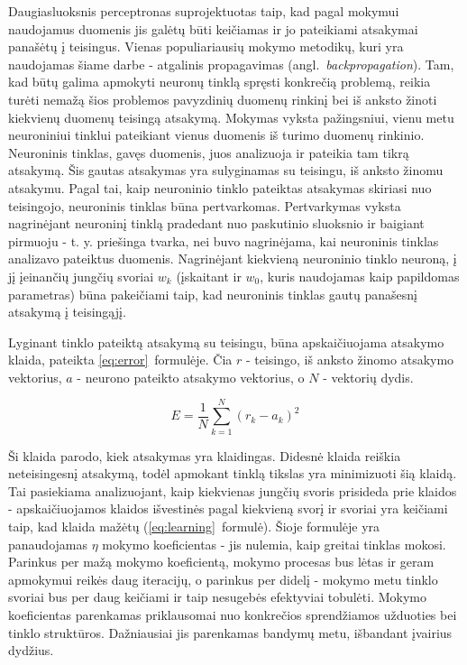 \documentclass{VUMIFPSbakalaurinis}
\begin{document}
Daugiasluoksnis perceptronas suprojektuotas taip, kad pagal mokymui naudojamus duomenis jis galėtų būti keičiamas ir jo pateikiami atsakymai panašėtų į teisingus.
Vienas populiariausių mokymo metodikų, kuri yra naudojamas šiame darbe - atgalinis propagavimas (angl.~\textit{backpropagation}).
Tam, kad būtų galima apmokyti neuronų tinklą spręsti konkrečią problemą, reikia turėti nemažą šios problemos pavyzdinių duomenų rinkinį bei iš anksto žinoti kiekvienų duomenų teisingą atsakymą.
Mokymas vyksta pažingsniui, vienu metu neuroniniui tinklui pateikiant vienus duomenis iš turimo duomenų rinkinio.
Neuroninis tinklas, gavęs duomenis, juos analizuoja ir pateikia tam tikrą atsakymą.
Šis gautas atsakymas yra sulyginamas su teisingu, iš anksto žinomu atsakymu.
Pagal tai, kaip neuroninio tinklo pateiktas atsakymas skiriasi nuo teisingojo, neuroninis tinklas būna pertvarkomas.
Pertvarkymas vyksta nagrinėjant neuroninį tinklą pradedant nuo paskutinio sluoksnio ir baigiant pirmuoju - t. y. priešinga tvarka, nei buvo nagrinėjama, kai neuroninis tinklas analizavo pateiktus duomenis.
Nagrinėjant kiekvieną neuroninio tinklo neuroną, į jį įeinančių jungčių svoriai $w_k$ (įskaitant ir $w_0$, kuris naudojamas kaip papildomas parametras) būna pakeičiami taip, kad neuroninis tinklas gautų panašesnį atsakymą į teisingąjį.

Lyginant tinklo pateiktą atsakymą su teisingu, būna apskaičiuojama atsakymo klaida, pateikta \ref{eq:error}~formulėje.
Čia $r$ - teisingo, iš anksto žinomo atsakymo vektorius, $a$ - neurono pateikto atsakymo vektorius, o $N$ - vektorių dydis.

\begin{equation} \label{eq:error}
E = \frac{1}{N} \sum_{k=1}^N (r_k - a_k)^2
\end{equation}

Ši klaida parodo, kiek atsakymas yra klaidingas.
Didesnė klaida reiškia neteisingesnį atsakymą, todėl apmokant tinklą tikslas yra minimizuoti šią klaidą.
Tai pasiekiama analizuojant, kaip kiekvienas jungčių svoris prisideda prie klaidos - apskaičiuojamos klaidos išvestinės pagal kiekvieną svorį ir svoriai yra keičiami taip, kad klaida mažėtų (\ref{eq:learning}~formulė).
Šioje formulėje yra panaudojamas $\eta$ mokymo koeficientas - jis nulemia, kaip greitai tinklas mokosi.
Parinkus per mažą mokymo koeficientą, mokymo procesas bus lėtas ir geram apmokymui reikės daug iteracijų, o parinkus per didelį - mokymo metu tinklo svoriai bus per daug keičiami ir taip nesugebės efektyviai tobulėti.
Mokymo koeficientas parenkamas priklausomai nuo konkrečios sprendžiamos užduoties bei tinklo struktūros.
Dažniausiai jis parenkamas bandymų metu, išbandant įvairius dydžius.
\end{document}
